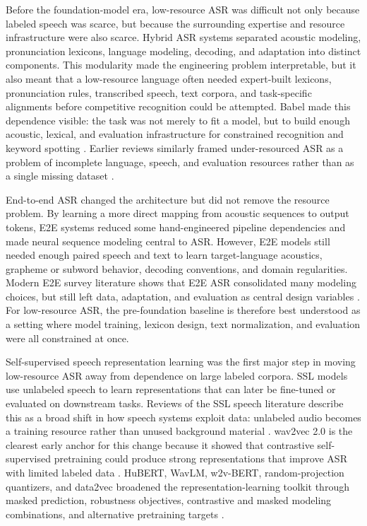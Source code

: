 \documentclass[pdflatex,sn-basic,iicol]{sn-jnl}
\theoremstyle{thmstyleone}
\theoremstyle{thmstyletwo}
\theoremstyle{thmstylethree}
\begin{document}
Before the foundation-model era, low-resource ASR was difficult not only because labeled speech was scarce, but because the surrounding expertise and resource infrastructure were also scarce. Hybrid ASR systems separated acoustic modeling, pronunciation lexicons, language modeling, decoding, and adaptation into distinct components. This modularity made the engineering problem interpretable, but it also meant that a low-resource language often needed expert-built lexicons, pronunciation rules, transcribed speech, text corpora, and task-specific alignments before competitive recognition could be attempted. Babel made this dependence visible: the task was not merely to fit a model, but to build enough acoustic, lexical, and evaluation infrastructure for constrained recognition and keyword spotting \citep{gales2014_babel_project_research_cued}. Earlier reviews similarly framed under-resourced ASR as a problem of incomplete language, speech, and evaluation resources rather than as a single missing dataset \citep{besacier2014_underresourced_asr_survey}.

End-to-end ASR changed the architecture but did not remove the resource problem. By learning a more direct mapping from acoustic sequences to output tokens, E2E systems reduced some hand-engineered pipeline dependencies and made neural sequence modeling central to ASR. However, E2E models still needed enough paired speech and text to learn target-language acoustics, grapheme or subword behavior, decoding conventions, and domain regularities. Modern E2E survey literature shows that E2E ASR consolidated many modeling choices, but still left data, adaptation, and evaluation as central design variables \citep{prabhavalkar2023_e2e_asr_survey}. For low-resource ASR, the pre-foundation baseline is therefore best understood as a setting where model training, lexicon design, text normalization, and evaluation were all constrained at once.

Self-supervised speech representation learning was the first major step in moving low-resource ASR away from dependence on large labeled corpora. SSL models use unlabeled speech to learn representations that can later be fine-tuned or evaluated on downstream tasks. Reviews of the SSL speech literature describe this as a broad shift in how speech systems exploit data: unlabeled audio becomes a training resource rather than unused background material \citep{mohamed2022_ssl_review}. wav2vec 2.0 is the clearest early anchor for this change because it showed that contrastive self-supervised pretraining could produce strong representations that improve ASR with limited labeled data \citep{baevski2020wav2vec2}. HuBERT, WavLM, w2v-BERT, random-projection quantizers, and data2vec broadened the representation-learning toolkit through masked prediction, robustness objectives, contrastive and masked modeling combinations, and alternative pretraining targets \citep{hsu2021hubert,chen2022wavlm,chung2021_w2vbert,pmlr-v162-chiu22a,pmlr-v162-baevski22a}.
\end{document}

